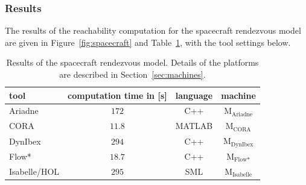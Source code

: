 \documentclass[EPiC]{easychair}
\begin{document}
\subsubsection{Results}

The results of the reachability computation for the spacecraft rendezvous model are given in Figure~\ref{fig:spacecraft} and Table~\ref{tab:compTimes:spacecraft}, with the tool settings below.

\begin{table}[t]
	\setlength{\tabcolsep}{4pt}
	\renewcommand{\arraystretch}{1.2}
	\centering
	\caption{Results of the spacecraft rendezvous model. Details of the platforms are described in Section~\ref{sec:machines}.}
	\begin{tabular}[c]{lccc}
	\hline
		 \textbf{tool} & \textbf{computation time in [s]} & \textbf{language} & \textbf{machine} \\
		 \hline
		 Ariadne & $172$ & C++ & M$_{\text{Ariadne}}$ \\
         CORA & $11.8$ & MATLAB & M$_{\text{CORA}}$ \\
         DynIbex & $294$ & C++ & M$_{\text{DynIbex}}$ \\
         Flow* & $18.7$ & C++ & M$_{\text{Flow*}}$ \\
         Isabelle/HOL & $295$ & SML & M$_{\text{Isabelle}}$ \\
		 \hline
	\end{tabular}
	\label{tab:compTimes:spacecraft}
\end{table}
\end{document}
